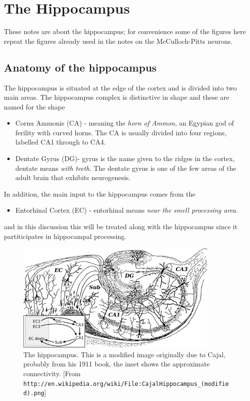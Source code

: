 \documentclass[11pt,a4paper]{scrartcl}
\begin{document}
\section*{The Hippocampus}
These notes are about the hippocampus; for convenience some of the
figures here repeat the figures already used in the notes on the
McCulloch-Pitts neurons.

\subsection*{Anatomy of the hippocampus}

The hippocampus is situated at the edge of the cortex and is divided
into two main areas. The hippocampus complex is distinctive in shape
and these are named for the shape
\begin{itemize}
\item Cornu Ammonis (CA) - meaning the \textsl{horn of Ammon}, an
  Egypian god of ferility with curved horns. The CA is usually divided
  into four regions, labelled CA1 through to CA4.
\item Dentate Gyrus (DG)- gyrus is the name given to the ridges in the
  cortex, dentate means \textsl{with teeth}. The dentate gyrus is one
  of the few areas of the adult brain that exhibits neurogenesis.
\end{itemize}
In addition, the main input to the hippocampus comes from the
\begin{itemize}
\item Entorhinal Cortex (EC) - entorhinal means \textsl{near the smell processing area}. 
\end{itemize}
and in this discussion this will be treated along with the hippocampus
since it partiticipates in hippocampal processing.

\begin{figure}
\begin{center}
\includegraphics[width=10cm]{640px:CajalHippocampus_(modified).png}
\end{center}
\caption{The hippocampus. This is a modified image originally due to
  Cajal, probably from his 1911 book, the inset shows the approximate
  connectivity. [From
    \texttt{http://en.wikipedia.org/wiki/File:CajalHippocampus\_(modified).png}]\label{fig:hippocampus}}
\end{figure}
\end{document}
